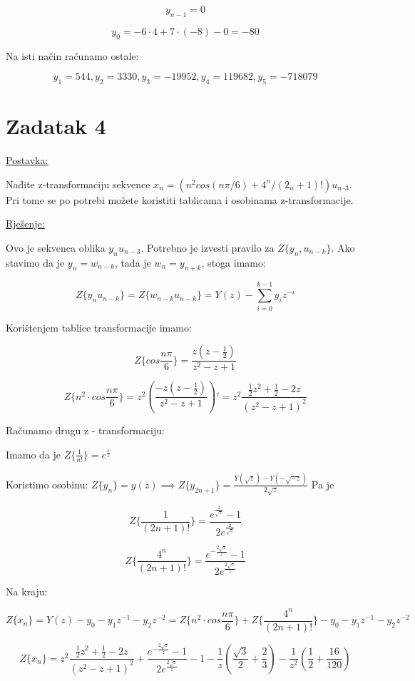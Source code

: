 \documentclass[12pt]{article}
\begin{document}
$$y_{n - 1} = 0$$

$$y_0 = -6 \cdot 4 + 7 \cdot (-8) - 0 = - 80$$

Na isti način računamo ostale:

$$y_1 = 544, y_2 = 3330, y_3 = -19952, y_4 = 119682, y_5 = -718079$$

\newpage

\section*{Zadatak 4\label{Z4}}

\underline{Postavka:}

Nađite z-transformaciju sekvence $x_n = (n^2 cos (n \pi / 6) + 4^n / (2_n + 1)! ) u_{n–3}$. Pri tome se po potrebi možete koristiti tablicama i osobinama z-transformacije.

\underline{Rješenje:}

Ovo je sekvenca oblika $y_n u_{n-3}$. Potrebno je izvesti pravilo za $Z\{y_n, u_{n - k}\}$. Ako stavimo da je $y_n = w_{n - k}$, tada je $w_n = y_{n + k}$, stoga imamo:

$$Z\{y_n u_{n - k}\} = Z\{w_{n-k} u_{n - k}\} = Y(z) - \sum_{i = 0}^{k - 1} y_i z^{-i}$$

Korištenjem tablice transformacije imamo:

$$Z\{cos \frac{n \pi}{6}\} = \frac{z (z - \frac{1}{2})}{z^2 - z + 1}$$

$$Z\{n^2 \cdot cos \frac{n \pi}{6}\} = z^2 (\frac{-z (z - \frac{1}{2})}{z^2 - z + 1}) ' = z^2 \frac{\frac{1}{2} z^2 + \frac{1}{2} - 2z}{(z^2 - z + 1)^2}$$

Računamo drugu z - transformaciju:

Imamo da je $Z\{\frac{1}{n!}\} = e ^{\frac{1}{z}}$

Koristimo osobinu: $Z\{y_n\} = y(z) \implies Z\{y_{2n + 1}\} = \frac{Y(\sqrt{z}) - Y(- \sqrt{- z})}{2 \sqrt{z}}$
Pa je

$$Z\{ \frac{1}{(2n + 1)!} \} = \frac{e^{\frac{2}{\sqrt{z}}} - 1}{2 e ^{\frac{2}{\sqrt{z}}}}$$

$$Z\{ \frac{4^n}{(2n + 1)!}\} = \frac{  e^{ - \frac{2 \sqrt{z}}{z} } - 1  }{2 e^{ \frac{2 \sqrt{z}}{z}}}$$

Na kraju:

$$Z \{x_n\} = Y(z) - y_0 - y_1 z^{-1} - y_2 z^{-2} = Z\{n^2 \cdot cos \frac{n \pi}{6}\} + Z\{ \frac{4^n}{(2n + 1)!}\} - y_0 - y_1 z^{-1} - y_2 z^{-2}$$

$$Z \{x_n\} = z^2 \frac{\frac{1}{2} z^2 + \frac{1}{2} - 2z}{(z^2 - z + 1)^2} + \frac{  e^{ - \frac{2 \sqrt{z}}{z} } - 1  }{2 e^{ \frac{2 \sqrt{z}}{z}}} - 1 - \frac{1}{z} (\frac{\sqrt{3}}{2} + \frac{2}{3}) - \frac{1}{z^2} (\frac{1}{2} + \frac{16}{120})$$
\end{document}
